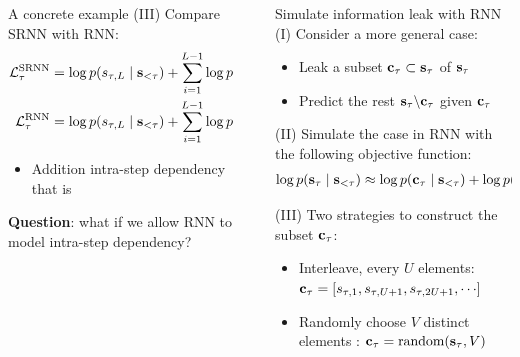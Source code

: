 \documentclass[final]{beamer}
\newlength{\sepwidth}
\newlength{\colwidth}
\newcommand{\separatorcolumn}{\begin{column}{\sepwidth}\end{column}}
\begin{document}
\begin{frame}[t]
\begin{columns}[t]
\begin{column}{\colwidth}
\begin{alertblock}{A concrete example}
 	(III) Compare SRNN with RNN:
 	\begin{align*}
 	\mathcal{L}^\text{SRNN}_\tau
 	&= \log p(s_{\tau,L} \mid {\mathbf{s}}_{<\tau}) + \sum_{i=1}^{L-1} \log p(s_{\tau,i} \mid {\color{magenta}s_{\tau,L}}, {\mathbf{s}}_{<\tau}) \\
 	\mathcal{L}^\text{RNN}_\tau
 	&= \log p(s_{\tau,L} \mid {\mathbf{s}}_{<\tau}) + \sum_{i=1}^{L-1} \log p(s_{\tau,i} \mid {\mathbf{s}}_{<\tau})
 	\end{align*}
 	\begin{itemize}
 		\item Addition intra-step dependency  that is 
 	\end{itemize}
\end{alertblock}

\textbf{Question}: what if we allow RNN to model intra-step dependency?

\end{column}

\separatorcolumn

\begin{column}{\colwidth}

\begin{block}{Simulate information leak with RNN}
	(I) Consider a more general case:
	\begin{itemize}
	\item Leak a subset ${\mathbf{c}}_\tau \subset {\mathbf{s}}_\tau$ of ${\mathbf{s}}_\tau$
	\item Predict the rest ${\mathbf{s}}_\tau \backslash {\mathbf{c}}_\tau$ given ${\mathbf{c}}_\tau$
	\end{itemize}
	  
	(II) Simulate the case in RNN with the following objective function:
	\begin{align*}
		\log p({\mathbf{s}}_{\tau} \mid {\mathbf{s}}_{<\tau}) \approx \log p({\mathbf{c}}_{\tau} \mid {\mathbf{s}}_{<\tau}) + \log p({\mathbf{s}}_{\tau} \backslash {\mathbf{c}}_{\tau} \mid {\mathbf{s}}_{<\tau}, {\mathbf{c}}_{\tau})
	\end{align*}
	
	(III) Two strategies to construct the subset ${\mathbf{c}}_{\tau}$:
	\begin{itemize}
		\item Interleave, every $U$ elements: ${\mathbf{c}}_{\tau} = \left[ {s_{\tau,1}, s_{\tau,U+1}, s_{\tau,2U+1}, \cdots } \right]$
		\item Randomly choose $V$ distinct elements : ${\mathbf{c}}_{\tau} = \text{random}({\mathbf{s}}_{\tau}, V)$
	\end{itemize}


\end{block}
\end{column}
\end{columns}
\end{frame}
\end{document}
